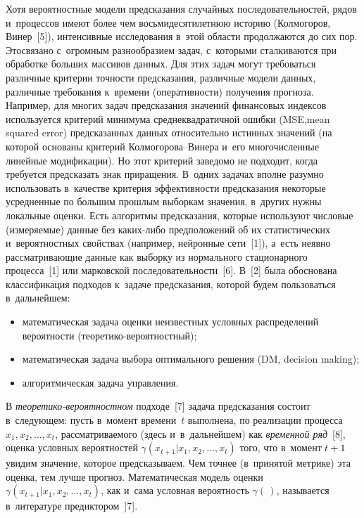 \begin{multicols}{2}
  Хотя вероятностные модели предсказания случайных 
последовательностей, рядов и~процессов имеют более чем 
восьмидесятилетнюю историю (Колмогоров, Винер~[5]), интенсивные 
исследования в~этой области продолжаются до сих пор. Это\linebreak связано 
с~огромным разнообразием задач, с~которыми сталкиваются при обработке 
больших массивов данных. Для этих задач могут требоваться различные 
критерии точности предсказания, \mbox{различные} модели данных, различные 
требования к~времени (оперативности) получения прогноза. Например, для 
многих задач предсказания значений финансовых индексов используется 
критерий минимума среднеквадратичной ошибки (MSE,\linebreak mean squared error) предсказанных данных 
относительно истинных значений (на которой основаны критерий  
Кол\-мо\-го\-ро\-ва--Ви\-не\-ра и~его многочисленные линейные 
модификации). Но этот \mbox{критерий} заведомо не подходит, когда требуется 
предсказать знак приращения. В~одних задачах вполне разумно 
использовать в~качестве критерия эффективности предсказания некоторые 
усредненные по большим прошлым выборкам значения, в~других нужны 
локальные оценки. Есть алгоритмы предсказания, которые используют 
числовые (измеряемые) данные без ка\-ких-ли\-бо предположений об их 
статистических и~вероятностных свойствах (например, нейронные сети~[1]), 
а~есть неявно рассматривающие данные как выборку из нормального 
стационарного процесса~[1] или марковской последовательности~[6]. В~[2] 
была обоснована классификация подходов к~задаче предсказания, которой 
будем пользоваться в~дальнейшем:
  \begin{itemize}
\item математическая задача оценки неизвестных условных распределений 
вероятности (тео\-ре\-ти\-ко-ве\-ро\-ят\-ност\-ный);
  \item математическая задача выбора оптимального решения (DM, decision 
making);
  \item алгоритмическая задача управления.
  \end{itemize}
  
  В \textit{теоретико-вероятностном} подходе~[7] задача предсказания 
состоит в~следующем: пусть в~момент времени~$t$ выполнена, по реализации 
процесса $x_1, x_2, \ldots, x_t$, рассматриваемого (здесь и~в~дальнейшем) 
как \textit{временной ряд}~[8], оценка условных вероятностей 
$\gamma(x_{t+1}\vert x_1, x_2, \ldots, x_t)$ того, что в~момент $t\hm+1$ увидим 
значение, которое предсказываем. Чем точнее (в~принятой метрике) эта 
оценка, тем лучше прогноз. Математическая модель оценки 
$\gamma(x_{t+1}\vert x_1, x_2, \ldots, x_t)$, как и~сама условная вероятность 
$\gamma(\,)$, называется в~литературе предиктором~]7].
  

\end{multicols}
